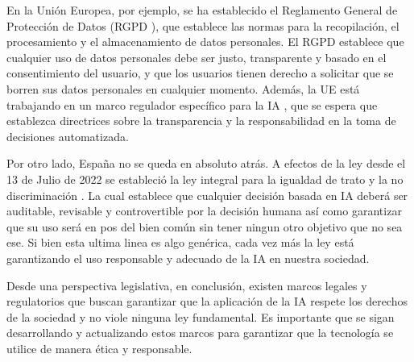 En la Unión Europea, por ejemplo, se ha establecido el Reglamento General de Protección de Datos (RGPD \cite{de2016reglamento}), que establece las normas para la recopilación, el procesamiento y el almacenamiento de datos personales. El RGPD establece que cualquier uso de datos personales debe ser justo, transparente y basado en el consentimiento del usuario, y que los usuarios tienen derecho a solicitar que se borren sus datos personales en cualquier momento. Además, la UE está trabajando en un marco regulador específico para la IA \cite{EU-IA} , que se espera que establezca directrices sobre la transparencia y la responsabilidad en la toma de decisiones automatizada.

Por otro lado, España no se queda en absoluto atrás. A efectos de la ley desde el 13 de Julio de 2022 se estableció la ley integral para la igualdad de trato y la no discriminación \cite{leyespanola}. La cual establece que cualquier decisión basada en IA deberá ser auditable, revisable y controvertible por la decisión humana así como garantizar que su uso será en pos del bien común sin tener ningun otro objetivo que no sea ese. Si bien esta ultima linea es algo genérica, cada vez más la ley está garantizando el uso responsable y adecuado de la IA en nuestra sociedad.

Desde una perspectiva legislativa, en conclusión, existen marcos legales y regulatorios que buscan garantizar que la aplicación de la IA respete los derechos de la sociedad y no viole ninguna ley fundamental. Es importante que se sigan desarrollando y actualizando estos marcos para garantizar que la tecnología se utilice de manera ética y responsable.